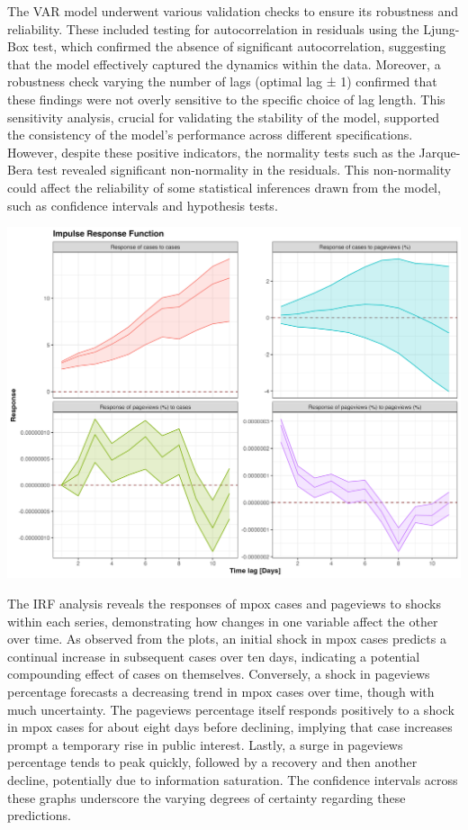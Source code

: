 \documentclass[
  12pt,
]{article}
\begin{document}
The VAR model underwent various validation checks to ensure its
robustness and reliability. These included testing for autocorrelation
in residuals using the Ljung-Box test, which confirmed the absence of
significant autocorrelation, suggesting that the model effectively
captured the dynamics within the data. Moreover, a robustness check
varying the number of lags (optimal lag ± 1) confirmed that these
findings were not overly sensitive to the specific choice of lag length.
This sensitivity analysis, crucial for validating the stability of the
model, supported the consistency of the model's performance across
different specifications. However, despite these positive indicators,
the normality tests such as the Jarque-Bera test revealed significant
non-normality in the residuals. This non-normality could affect the
reliability of some statistical inferences drawn from the model, such as
confidence intervals and hypothesis tests.~

\begin{center}
\includegraphics{images/impulse-response-function.png}
\end{center}

The IRF analysis reveals the responses of mpox cases and pageviews to
shocks within each series, demonstrating how changes in one variable
affect the other over time. As observed from the plots, an initial shock
in mpox cases predicts a continual increase in subsequent cases over ten
days, indicating a potential compounding effect of cases on themselves.
Conversely, a shock in pageviews percentage forecasts a decreasing trend
in mpox cases over time, though with much uncertainty. The pageviews
percentage itself responds positively to a shock in mpox cases for about
eight days before declining, implying that case increases prompt a
temporary rise in public interest. Lastly, a surge in pageviews
percentage tends to peak quickly, followed by a recovery and then
another decline, potentially due to information saturation. The
confidence intervals across these graphs underscore the varying degrees
of certainty regarding these predictions.
\end{document}
